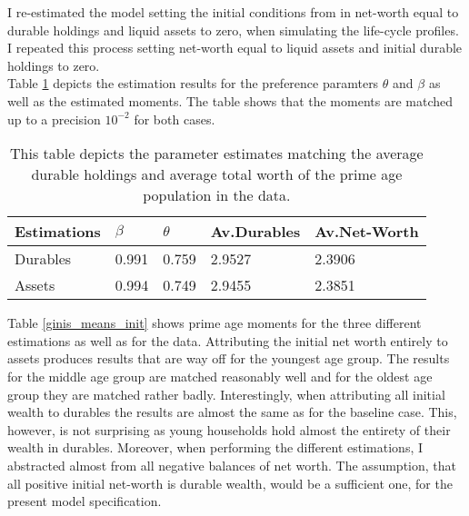 \documentclass[a4paper,12pt,legno]{article}
\begin{document}
I re-estimated the model setting the initial conditions from \cite{hintermaier2011} in net-worth equal to durable holdings and liquid assets to zero, when simulating the life-cycle profiles. I repeated this process setting net-worth equal to liquid assets and initial durable holdings to zero.\\
Table \ref{estimates_initial_cond} depicts the estimation results for the preference paramters $\theta$ and $\beta$ as well as the estimated moments. The table shows that the moments are matched up to a precision $10^{-2}$ for both cases. 

\begin{table}[!htbp]
\centering
\caption{This table depicts the parameter estimates matching the average durable holdings and average total worth of the prime age population in the data.}
\label{estimates_initial_cond}
\begin{tabular}{llllll}
\hline
\multicolumn{2}{l}{Estimations} & $\beta$ & $\theta$ & Av.Durables & Av.Net-Worth\\ \hline
\multicolumn{2}{l}{Durables}             & 0.991    & 0.759  & 2.9527 & 2.3906      \\
\multicolumn{2}{l}{Assets}            & 0.994   & 0.749   & 2.9455 & 2.3851    
\end{tabular}
\end{table}

Table \ref{ginis_means_init} shows prime age moments for the three different estimations as well as for the data. Attributing the initial net worth entirely to assets produces results that are way off for the youngest age group. The results for the middle age group are matched reasonably well and for the oldest age group they are matched rather badly. Interestingly, when attributing all initial wealth to durables the results are almost the same as for the baseline case. This, however, is not surprising as young households hold almost the entirety of their wealth in durables. Moreover, when performing the different estimations, I abstracted almost from all negative balances of net worth. 
The assumption, that all positive initial net-worth is durable wealth, would be a sufficient one, for the present model specification. 
\end{document}
